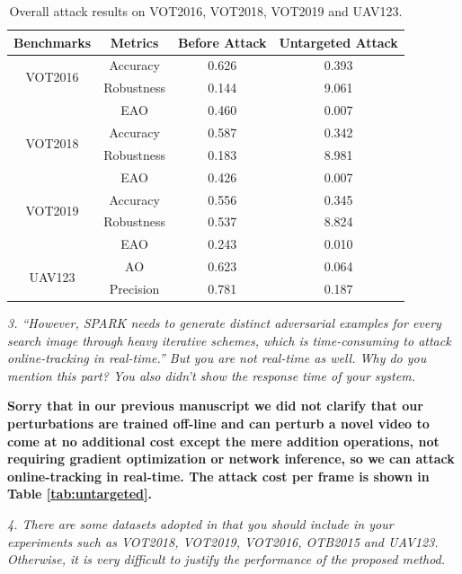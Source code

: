 \documentclass[12pt]{article}
\begin{document}
\begin{table}[t]
    \renewcommand\thetable{IV} 
    \centering
    \caption{Overall attack results on VOT2016, VOT2018, VOT2019 and UAV123.}
    \begin{tabular}{c c | c | c}
    \toprule
    Benchmarks & Metrics & Before Attack    & Untargeted Attack  \\
    \midrule
    \multirow{2}{*}[-6pt]{VOT2016} 
    & Accuracy   & 0.626 & 0.393\\
    & Robustness & 0.144 & 9.061\\
    & EAO        & 0.460 & 0.007\\
    \midrule
    \multirow{2}{*}[-6pt]{VOT2018} 
    & Accuracy   & 0.587 & 0.342\\
    & Robustness & 0.183 & 8.981\\
    & EAO        & 0.426 & 0.007\\
    \midrule
    \multirow{2}{*}[-6pt]{VOT2019} 
    & Accuracy   & 0.556 & 0.345\\
    & Robustness & 0.537 & 8.824\\
    & EAO        & 0.243 & 0.010\\
    \midrule
    \multirow{3}{*}[+6pt]{UAV123} 
    & AO  & 0.623 & 0.064\\
    & Precision & 0.781 & 0.187\\
    \bottomrule
    \end{tabular}
    \label{tab:benchmark results1}
\end{table}

\textit{3. “However, SPARK needs to generate distinct adversarial examples for every search image through heavy iterative schemes, which is time-consuming to attack online-tracking in real-time.” But you are not real-time as well. Why do you mention this part? You also didn’t show the response time of your system.}

\textbf{Sorry that in our previous manuscript we did not clarify that our perturbations are trained off-line and can perturb a novel video to come at no additional cost except the mere addition operations, not requiring gradient optimization or network inference, so we can attack online-tracking in real-time. The attack cost per frame is shown in Table \ref{tab:untargeted}.}

\textit{4. There are some datasets adopted in \cite{SPARK,RTAA} that you should include in your experiments such as VOT2018, VOT2019, VOT2016, OTB2015 and UAV123. Otherwise, it is very difficult to justify the performance of the proposed method.}
\end{document}
